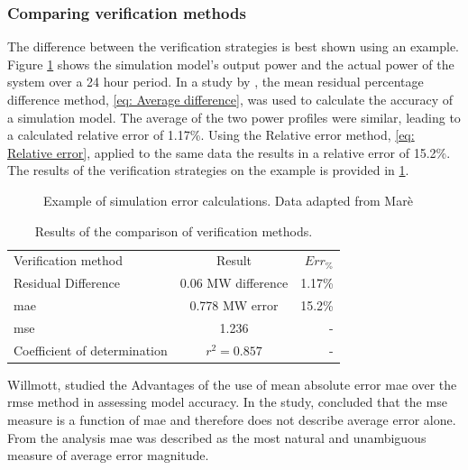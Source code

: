  		\subsubsection{Comparing verification methods}
 		The difference between the verification strategies is best shown using an example. Figure \cref{fig:Philipp Difference verify} shows the simulation model's output power and the actual power of the system over a 24 hour period. In a study by \cite{Mare2016PhD}, the mean residual percentage difference method, \cref{eq: Average difference}, was used to calculate the accuracy of a simulation model. The average of the two power profiles were similar, leading to a calculated relative error of 1.17\%. Using the Relative error method, \cref{eq: Relative error}, applied to the same data the results in a relative error of 15.2\%. The results of the verification strategies on the example is provided in \cref{Philip verification table}.
 		
 	\begin{figure}[h!]
 		\centering
 		
 		\caption[Example of simulation error calculations.]{Example of simulation error calculations. Data adapted from Marè \cite{Mare2016PhD}}
 		\label{fig:Philipp Difference verify}
 	\end{figure}
 
 \begin{table}[h!]
 	\label{Philip verification table}
 	\centering
 	\begin{tabular}{lcr}
 		\hline
 		Verification method & Result & $Err_{\%}$\\
 		\hhline{===}
 		Residual Difference          & 0.06 MW difference  & 1.17\% \\
 		\gls{mae} 					 & 0.778 MW error & 15.2\% \\
 		\gls{mse} 				     & 1.236    & -\\
 		Coefficient of determination & $r^2 =0.857$   & -\\
 		\hline
 	\end{tabular} 
 \caption{Results of the comparison of verification methods.}
 \end{table}
 
 	\par 
 	Willmott, \cite{willmott2005advantages} studied the Advantages of the use of mean absolute error \gls{mae} over the \gls{rmse} method in assessing model accuracy. In the study,\cite{willmott2005advantages} concluded that the \gls{mse} measure is a function of \gls{mae} and therefore does not describe average error alone. From the analysis \gls{mae} was described as the most natural and unambiguous measure of average error magnitude.

